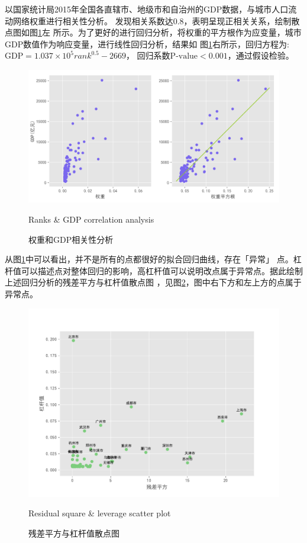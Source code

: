 以国家统计局2015年全国各直辖市、地级市和自治州的GDP数据，与城市人口流动网络权重进行相关性分析。
发现相关系数达$0.8$，表明呈现正相关关系，绘制散点图如图\ref{fig:rankgdpcorrelationanalysis}左
所示。为了更好的进行回归分析，将权重的平方根作为应变量，城市GDP数值作为响应变量，进行线性回归分析，结果如
图\ref{fig:rankgdpcorrelationanalysis}右所示，回归方程为:$\text{GDP} = 1.037\times 10^5 rank^{0.5}-2669$，
回归系数$\text{P-value} < 0.001$，通过假设检验。
\begin{figure}
  \centering
  \includegraphics[scale=0.6]{figures/rank_gdp_scatter.png} \\
  \caption{权重和GDP相关性分析}{Ranks \& GDP correlation analysis}
  \label{fig:rankgdpcorrelationanalysis}
\end{figure}

从图\ref{fig:rankgdpcorrelationanalysis}中可以看出，并不是所有的点都很好的拟合回归曲线，存在「异常」
点。杠杆值可以描述点对整体回归的影响，高杠杆值可以说明改点属于异常点。据此绘制上述回归分析的残差平方与杠杆值散点图
，见图\ref{fig:residualLeverage}，图中右下方和左上方的点属于异常点。
\begin{figure}
  \centering
  \includegraphics[scale=0.6]{figures/leverage.pdf} \\
  \caption{残差平方与杠杆值散点图}{Residual square \& leverage scatter plot}
  \label{fig:residualLeverage}
\end{figure}


